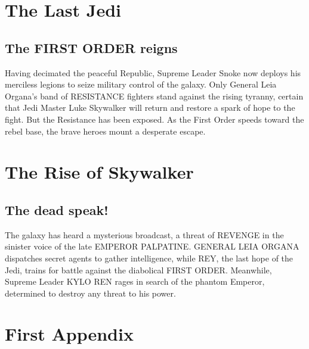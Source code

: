 \documentclass[oneside]{ifgw}
\begin{document}
\lipsum[1-10]

\chapter{The Last Jedi}
\section{The FIRST ORDER reigns}
Having decimated the peaceful Republic, Supreme Leader Snoke 
now deploys his merciless legions to seize military control 
of the galaxy. Only General Leia Organa's band of RESISTANCE 
fighters stand against the rising tyranny, certain that Jedi 
Master Luke Skywalker will return and restore a spark of hope 
to the fight. But the Resistance has been exposed. As the 
First Order speeds toward the rebel base, the brave heroes 
mount a desperate escape.
\lipsum[1-10]

\chapter{The Rise of Skywalker}
\section{The dead speak!}
The galaxy has heard a mysterious broadcast, a threat of 
REVENGE in the sinister voice of the late EMPEROR PALPATINE. 
GENERAL LEIA ORGANA dispatches secret agents to gather 
intelligence, while REY, the last hope of the Jedi, trains 
for battle against the diabolical FIRST ORDER. Meanwhile, 
Supreme Leader KYLO REN rages in search of the phantom 
Emperor, determined to destroy any threat to his power.

\lipsum[1-20]

\cite{CHAUDHURI_2014,MATSUI_1986,MROWCZYNSKI_1998}
\cite{THEWS_2001}
\cite{EICHTEN_1980}
\cite{CHAUDHURI_2014}
\cite{MROWCZYNSKI_1998}
\cite{BJORKEN_1983}
\cite{THEWS_2001}
\cite{MATSUI_1986}
\cite{RAGHUNATH_2018}
\cite{VOGT_2007}
\cite{FLORKOWSKI_2010}
\cite{GROSS_1973}
\cite{POLITZER_1973}
\cite{BARTKE_2009}
\cite{EICHTEN_1980e}

\appendix

\chapter{First Appendix}



\end{document}
